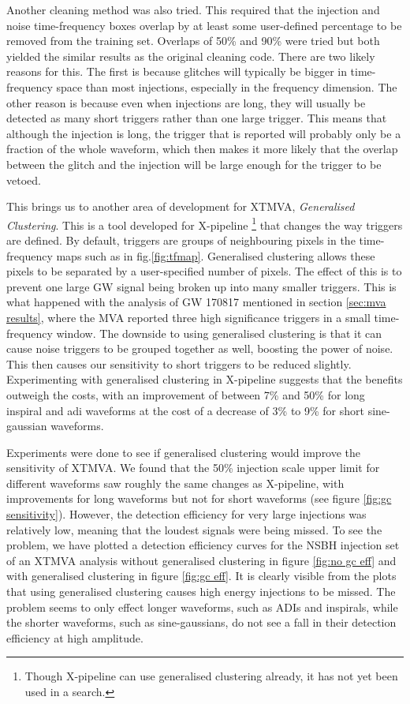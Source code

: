 \documentclass[11pt]{cuthesis}
\newcommand{\xp}{X-pipeline }
\begin{document}
Another cleaning method was also tried. This required that the injection and noise time-frequency boxes overlap by at least some user-defined percentage to be removed from the training set. Overlaps of 50\% and 90\% were tried but both yielded the similar results as the original cleaning code. There are two likely reasons for this. The first is because glitches will typically be bigger in time-frequency space than most injections, especially in the frequency dimension. The other reason is because even when injections are long, they will usually be detected as many short triggers rather than one large trigger. This means that although the injection is long, the trigger that is reported will probably only be a fraction of the whole waveform, which then makes it more likely that the overlap between the glitch and the injection will be large enough for the trigger to be vetoed.

This brings us to another area of development for XTMVA, \textit{Generalised Clustering}. This is a tool developed for \xp\footnote{Though \xp can use generalised clustering already, it has not yet been used in a search.} that changes the way triggers are defined. By default, triggers are groups of neighbouring pixels in the time-frequency maps such as in fig.\ref{fig:tfmap}. Generalised clustering allows these pixels to be separated by a user-specified number of pixels. The effect of this is to prevent one large GW signal being broken up into many smaller triggers. This is what happened with the analysis of GW 170817 mentioned in section \ref{sec:mva results}, where the MVA reported three high significance triggers in a small time-frequency window. The downside to using generalised clustering is that it can cause noise triggers to be grouped together as well, boosting the power of noise. This then causes our sensitivity to short triggers to be reduced slightly. Experimenting with generalised clustering in \xp suggests that the benefits outweigh the costs, with an improvement of between 7\% and 50\% for long inspiral and adi waveforms at the cost of a decrease of 3\% to 9\% for short sine-gaussian waveforms. 

Experiments were done to see if generalised clustering would improve the sensitivity of XTMVA. We found that the 50\% injection scale upper limit for different waveforms saw roughly the same changes as X-pipeline, with improvements for long waveforms but not for short waveforms (see figure \ref{fig:gc sensitivity}). However, the detection efficiency for very large injections was relatively low, meaning that the loudest signals were being missed. To see the problem, we have plotted a detection efficiency curves for the NSBH injection set of an XTMVA analysis without generalised clustering in figure \ref{fig:no gc eff} and with generalised clustering in figure \ref{fig:gc eff}. It is clearly visible from the plots that using generalised clustering causes high energy injections to be missed. The problem seems to only effect longer waveforms, such as ADIs and inspirals, while the shorter waveforms, such as sine-gaussians, do not see a fall in their detection efficiency at high amplitude.
\end{document}
